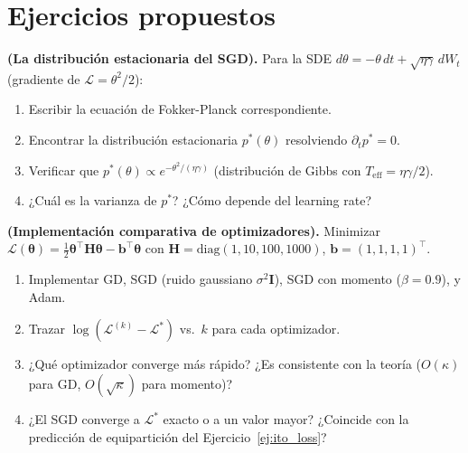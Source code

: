 \section*{Ejercicios propuestos}

\begin{ejercicio}
\textbf{(La distribución estacionaria del SGD).}
Para la SDE $d\theta = -\theta\,dt + \sqrt{\eta\gamma}\,dW_t$
(gradiente de $\mathcal{L} = \theta^2/2$):
\begin{enumerate}[label=(\alph*)]
  \item Escribir la ecuación de Fokker-Planck correspondiente.
  \item Encontrar la distribución estacionaria $p^*(\theta)$
        resolviendo $\partial_t p^* = 0$.
  \item Verificar que $p^*(\theta) \propto
        e^{-\theta^2/(\eta\gamma)}$ (distribución de Gibbs con
        $T_{\text{eff}} = \eta\gamma/2$).
  \item ¿Cuál es la varianza de $p^*$? ¿Cómo depende del learning rate?
\end{enumerate}
\end{ejercicio}

\begin{ejercicio}
\textbf{(Implementación comparativa de optimizadores).}
Minimizar $\mathcal{L}(\bm{\theta}) = \frac{1}{2}\bm{\theta}^\top
\bm{H}\bm{\theta} - \bm{b}^\top\bm{\theta}$ con
$\bm{H} = \text{diag}(1, 10, 100, 1000)$, $\bm{b} = (1,1,1,1)^\top$.
\begin{enumerate}[label=(\alph*)]
  \item Implementar GD, SGD (ruido gaussiano $\sigma^2\bm{I}$), SGD con
        momento ($\beta = 0.9$), y Adam.
  \item Trazar $\log(\mathcal{L}^{(k)}-\mathcal{L}^*)$ vs.\ $k$ para
        cada optimizador.
  \item ¿Qué optimizador converge más rápido? ¿Es consistente con la
        teoría ($O(\kappa)$ para GD, $O(\sqrt{\kappa})$ para momento)?
  \item ¿El SGD converge a $\mathcal{L}^*$ exacto o a un valor mayor?
        ¿Coincide con la predicción de equipartición del
        Ejercicio~\ref{ej:ito_loss}?
\end{enumerate}
\end{ejercicio}

